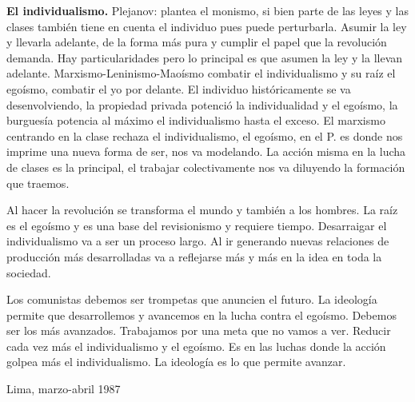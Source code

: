 \documentclass[
  a4paper,
]{article}
\begin{document}
\textbf{El individualismo.} Plejanov: plantea el monismo, si bien parte
de las leyes y las clases también tiene en cuenta el individuo pues
puede perturbarla. Asumir la ley y llevarla adelante, de la forma más
pura y cumplir el papel que la revolución demanda. Hay particularidades
pero lo principal es que asumen la ley y la llevan adelante.
Marxismo-Leninismo-Maoísmo combatir el individualismo y su raíz el
egoísmo, combatir el yo por delante. El individuo históricamente se va
desenvolviendo, la propiedad privada potenció la individualidad y el
egoísmo, la burguesía potencia al máximo el individualismo hasta el
exceso. El marxismo centrando en la clase rechaza el individualismo, el
egoísmo, en el P. es donde nos imprime una nueva forma de ser, nos va
modelando. La acción misma en la lucha de clases es la principal, el
trabajar colectivamente nos va diluyendo la formación que traemos.

Al hacer la revolución se transforma el mundo y también a los hombres.
La raíz es el egoísmo y es una base del revisionismo y requiere tiempo.
Desarraigar el individualismo va a ser un proceso largo. Al ir generando
nuevas relaciones de producción más desarrolladas va a reflejarse más y
más en la idea en toda la sociedad.

Los comunistas debemos ser trompetas que anuncien el futuro. La
ideología permite que desarrollemos y avancemos en la lucha contra el
egoísmo. Debemos ser los más avanzados. Trabajamos por una meta que no
vamos a ver. Reducir cada vez más el individualismo y el egoísmo. Es en
las luchas donde la acción golpea más el individualismo. La ideología es
lo que permite avanzar.

Lima, marzo-abril 1987


\printbibliography
\end{document}
